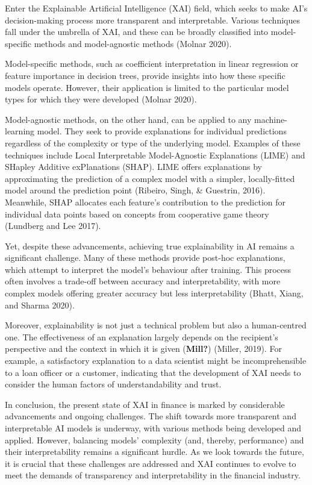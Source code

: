 \documentclass[
  letterpaper,
  DIV=11,
  numbers=noendperiod]{scrartcl}
\begin{document}
Enter the Explainable Artificial Intelligence (XAI) field, which seeks
to make AI's decision-making process more transparent and interpretable.
Various techniques fall under the umbrella of XAI, and these can be
broadly classified into model-specific methods and model-agnostic
methods (Molnar 2020).

Model-specific methods, such as coefficient interpretation in linear
regression or feature importance in decision trees, provide insights
into how these specific models operate. However, their application is
limited to the particular model types for which they were developed
(Molnar 2020).

Model-agnostic methods, on the other hand, can be applied to any
machine-learning model. They seek to provide explanations for individual
predictions regardless of the complexity or type of the underlying
model. Examples of these techniques include Local Interpretable
Model-Agnostic Explanations (LIME) and SHapley Additive exPlanations
(SHAP). LIME offers explanations by approximating the prediction of a
complex model with a simpler, locally-fitted model around the prediction
point (Ribeiro, Singh, \& Guestrin, 2016). Meanwhile, SHAP allocates
each feature's contribution to the prediction for individual data points
based on concepts from cooperative game theory (Lundberg and Lee 2017).

Yet, despite these advancements, achieving true explainability in AI
remains a significant challenge. Many of these methods provide post-hoc
explanations, which attempt to interpret the model's behaviour after
training. This process often involves a trade-off between accuracy and
interpretability, with more complex models offering greater accuracy but
less interpretability (Bhatt, Xiang, and Sharma 2020).

Moreover, explainability is not just a technical problem but also a
human-centred one. The effectiveness of an explanation largely depends
on the recipient's perspective and the context in which it is given
(\textbf{Mill?}) (Miller, 2019). For example, a satisfactory explanation
to a data scientist might be incomprehensible to a loan officer or a
customer, indicating that the development of XAI needs to consider the
human factors of understandability and trust.

In conclusion, the present state of XAI in finance is marked by
considerable advancements and ongoing challenges. The shift towards more
transparent and interpretable AI models is underway, with various
methods being developed and applied. However, balancing models'
complexity (and, thereby, performance) and their interpretability
remains a significant hurdle. As we look towards the future, it is
crucial that these challenges are addressed and XAI continues to evolve
to meet the demands of transparency and interpretability in the
financial industry.
\end{document}
